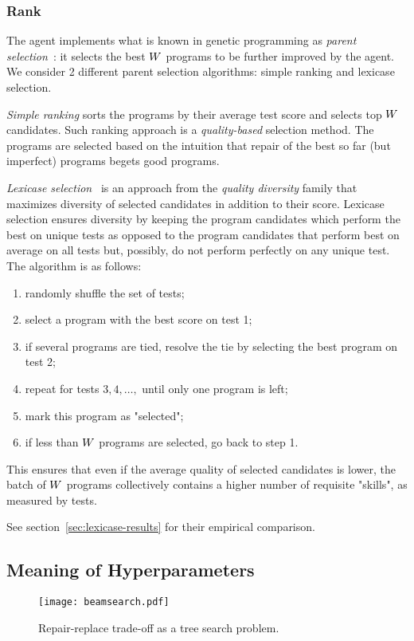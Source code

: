\subsubsection{Rank}

The \rank{} agent implements what is known in genetic programming as \emph{parent selection}~\cite{koza1994:genetic}: it selects the best $W{}$ programs to be further improved by the \debug{} agent.
We consider 2 different parent selection algorithms: simple ranking and lexicase selection.

\emph{Simple ranking} sorts the programs by their average test score and selects top $W{}$ candidates. 
Such ranking approach is a \emph{quality-based} selection method.
The programs are selected based on the intuition that repair of the best so far (but imperfect) programs begets good programs.

\emph{Lexicase selection}~\cite{helmuth2015:solving} is an approach from the \emph{quality diversity} family that maximizes diversity of selected candidates in addition to their score.
Lexicase selection ensures diversity by keeping the program candidates which perform the best on unique tests as opposed to the program candidates that perform best on average on all tests but, possibly, do not perform perfectly on any unique test.
The algorithm is as follows:
\begin{enumerate}
    \item randomly shuffle the set of tests;
    \item select a program with the best score on test 1;
    \item if several programs are tied, resolve the tie by selecting the best program on test 2;
    \item repeat for tests $3,4,\dots,$ until only one program is left;
    \item mark this program as "selected";
    \item if less than $W$ programs are selected, go back to step 1.
\end{enumerate}
This ensures that even if the average quality of selected candidates is lower, the batch of $W{}$ programs collectively contains a higher number of requisite "skills", as measured by tests.

See section~\ref{sec:lexicase-results} for their empirical comparison.

\subsection{Meaning of Hyperparameters}
\label{sec:beam-search}
\begin{figure}
    \centering
    \texttt{[image: beamsearch.pdf]}
    \caption{Repair-replace trade-off as a tree search problem.}
    \label{fig:beam-search}
\end{figure}

